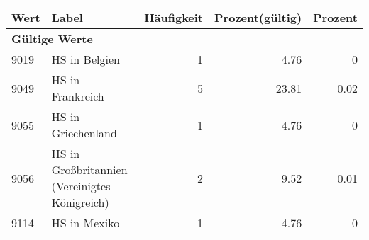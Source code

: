      \begin{longtable}{lXrrr}
     \toprule
     \textbf{Wert} & \textbf{Label} & \textbf{Häufigkeit} & \textbf{Prozent(gültig)} & \textbf{Prozent} \\
     \endhead
     \midrule
     \multicolumn{5}{l}{\textbf{Gültige Werte}}\\

     9019 &
     \multicolumn{1}{X}{ HS in Belgien   } &


       \num{1} &
       \num[round-mode=places,round-precision=2]{4.76} &
         \num[round-mode=places,round-precision=2]{0} \\

     9049 &
     \multicolumn{1}{X}{ HS in Frankreich   } &


       \num{5} &
       \num[round-mode=places,round-precision=2]{23.81} &
         \num[round-mode=places,round-precision=2]{0.02} \\

     9055 &
     \multicolumn{1}{X}{ HS in Griechenland   } &


       \num{1} &
       \num[round-mode=places,round-precision=2]{4.76} &
         \num[round-mode=places,round-precision=2]{0} \\

     9056 &
     \multicolumn{1}{X}{ HS in Großbritannien (Vereinigtes Königreich)   } &


       \num{2} &
       \num[round-mode=places,round-precision=2]{9.52} &
         \num[round-mode=places,round-precision=2]{0.01} \\

     9114 &
     \multicolumn{1}{X}{ HS in Mexiko   } &


       \num{1} &
       \num[round-mode=places,round-precision=2]{4.76} &
         \num[round-mode=places,round-precision=2]{0} \\


\end{longtable}
